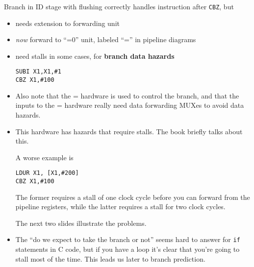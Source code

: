 \begin{frame}[fragile]
Branch in ID stage with flushing correctly handles instruction after \texttt{CBZ}, but
  \begin{itemize}
	  \item needs extension to forwarding unit
   \item \textit{now} forward to ``=0'' unit, labeled ``='' in pipeline diagrams

  \item need stalls in some cases,  for \textbf{branch data hazards}
\begin{verbatim}
SUBI X1,X1,#1
CBZ X1,#100
\end{verbatim}
  \end{itemize}

  
\BNotes\ifnum{}
\begin{itemize}
	\item Also note that the = hardware is used to control the
		branch, and that the inputs to the = hardware really
		need data forwarding MUXes to avoid data hazards.
	\item This hardware has hazards that require stalls.
		The book briefly talks about this.

		A worse example is
\begin{verbatim}
LDUR X1, [X1,#200]
CBZ X1,#100
\end{verbatim}
The former requires a stall of one clock cycle before you can forward
from the pipeline registers, while the latter requires a stall for
two clock cycles.

The next two slides illustrate the problems.
\item The ``do we expect to take the branch or not'' seems hard to
  answer for \texttt{if} statements in C code, but if you have a loop
  it's clear that you're going to stall most of the time.  This leads
  us later to branch prediction.
\end{itemize}
\fi\ENotes
\end{frame}

